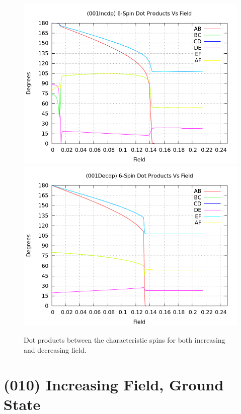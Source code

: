 \documentclass{article}
\begin{document}
\begin{center}
\begin{figure}
\centering
\includegraphics[scale=0.5]{HVariedData/Pictures/001Incdp.png}
\includegraphics[scale=0.5]{HVariedData/Pictures/001Decdp.png}
\caption{Dot products between the characteristic spins for both increasing and decreasing field.}
\end{figure}
\end{center}

\clearpage

\section{(010) Increasing Field, Ground State}
\end{document}
